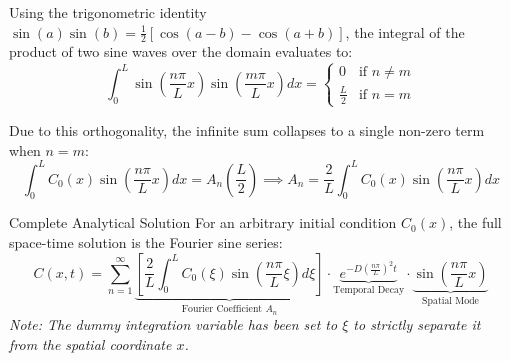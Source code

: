 \begin{expertbox}
Using the trigonometric identity $\sin(a)\sin(b) = \frac{1}{2}[\cos(a-b) - \cos(a+b)]$, the integral of the product of two sine waves over the domain evaluates to:
\[
\int_{0}^{L} \sin\left(\frac{n\pi}{L}x\right)\sin\left(\frac{m\pi}{L}x\right) dx = 
\begin{cases} 
0 & \text{if } n \neq m \\ 
\frac{L}{2} & \text{if } n = m 
\end{cases}
\]
\end{expertbox}

Due to this orthogonality, the infinite sum collapses to a single non-zero term when $n=m$:
\[
\int_{0}^{L} C_{0}(x)\sin\left(\frac{n\pi}{L}x\right) dx = A_{n}\left(\frac{L}{2}\right) \implies A_{n} = \frac{2}{L}\int_{0}^{L} C_{0}(x)\sin\left(\frac{n\pi}{L}x\right) dx
\]

\begin{resultboxnamed}{Complete Analytical Solution}
For an arbitrary initial condition $C_0(x)$, the full space-time solution is the Fourier sine series:
\begin{equation}
C(x,t) = \sum_{n=1}^{\infty} \underbrace{\left[ \frac{2}{L}\int_{0}^{L} C_{0}(\xi)\sin\left(\frac{n\pi}{L}\xi\right) d\xi \right]}_{\text{Fourier Coefficient } A_n} \cdot \underbrace{e^{-D\left(\frac{n\pi}{L}\right)^{2}t}}_{\text{Temporal Decay}} \cdot \underbrace{\sin\left(\frac{n\pi}{L}x\right)}_{\text{Spatial Mode}}
\end{equation}
\textit{Note: The dummy integration variable has been set to $\xi$ to strictly separate it from the spatial coordinate $x$.}
\end{resultboxnamed}